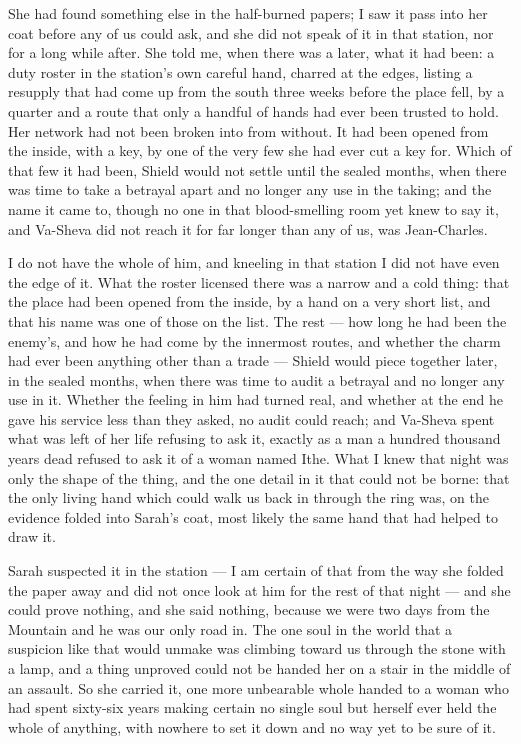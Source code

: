She had found something else in the half-burned papers; I saw it pass into her coat before any of us could ask, and she did not speak of it in that station, nor for a long while after. She told me, when there was a later, what it had been: a duty roster in the station's own careful hand, charred at the edges, listing a resupply that had come up from the south three weeks before the place fell, by a quarter and a route that only a handful of hands had ever been trusted to hold. Her network had not been broken into from without. It had been opened from the inside, with a key, by one of the very few she had ever cut a key for. Which of that few it had been, Shield would not settle until the sealed months, when there was time to take a betrayal apart and no longer any use in the taking; and the name it came to, though no one in that blood-smelling room yet knew to say it, and Va-Sheva did not reach it for far longer than any of us, was Jean-Charles.\par

I do not have the whole of him, and kneeling in that station I did not have even the edge of it. What the roster licensed there was a narrow and a cold thing: that the place had been opened from the inside, by a hand on a very short list, and that his name was one of those on the list. The rest --- how long he had been the enemy's, and how he had come by the innermost routes, and whether the charm had ever been anything other than a trade --- Shield would piece together later, in the sealed months, when there was time to audit a betrayal and no longer any use in it. Whether the feeling in him had turned real, and whether at the end he gave his service less than they asked, no audit could reach; and Va-Sheva spent what was left of her life refusing to ask it, exactly as a man a hundred thousand years dead refused to ask it of a woman named Ithe. What I knew that night was only the shape of the thing, and the one detail in it that could not be borne: that the only living hand which could walk us back in through the ring was, on the evidence folded into Sarah's coat, most likely the same hand that had helped to draw it.\par

Sarah suspected it in the station --- I am certain of that from the way she folded the paper away and did not once look at him for the rest of that night --- and she could prove nothing, and she said nothing, because we were two days from the Mountain and he was our only road in. The one soul in the world that a suspicion like that would unmake was climbing toward us through the stone with a lamp, and a thing unproved could not be handed her on a stair in the middle of an assault. So she carried it, one more unbearable whole handed to a woman who had spent sixty-six years making certain no single soul but herself ever held the whole of anything, with nowhere to set it down and no way yet to be sure of it.\par

